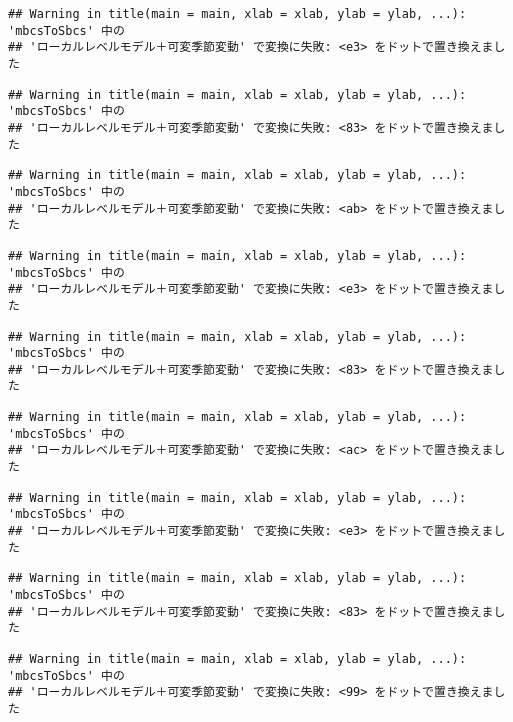 \documentclass[]{article}
\begin{document}
\begin{verbatim}
## Warning in title(main = main, xlab = xlab, ylab = ylab, ...): 'mbcsToSbcs' 中の
## 'ローカルレベルモデル＋可変季節変動' で変換に失敗: <e3> をドットで置き換えました
\end{verbatim}

\begin{verbatim}
## Warning in title(main = main, xlab = xlab, ylab = ylab, ...): 'mbcsToSbcs' 中の
## 'ローカルレベルモデル＋可変季節変動' で変換に失敗: <83> をドットで置き換えました
\end{verbatim}

\begin{verbatim}
## Warning in title(main = main, xlab = xlab, ylab = ylab, ...): 'mbcsToSbcs' 中の
## 'ローカルレベルモデル＋可変季節変動' で変換に失敗: <ab> をドットで置き換えました
\end{verbatim}

\begin{verbatim}
## Warning in title(main = main, xlab = xlab, ylab = ylab, ...): 'mbcsToSbcs' 中の
## 'ローカルレベルモデル＋可変季節変動' で変換に失敗: <e3> をドットで置き換えました
\end{verbatim}

\begin{verbatim}
## Warning in title(main = main, xlab = xlab, ylab = ylab, ...): 'mbcsToSbcs' 中の
## 'ローカルレベルモデル＋可変季節変動' で変換に失敗: <83> をドットで置き換えました
\end{verbatim}

\begin{verbatim}
## Warning in title(main = main, xlab = xlab, ylab = ylab, ...): 'mbcsToSbcs' 中の
## 'ローカルレベルモデル＋可変季節変動' で変換に失敗: <ac> をドットで置き換えました
\end{verbatim}

\begin{verbatim}
## Warning in title(main = main, xlab = xlab, ylab = ylab, ...): 'mbcsToSbcs' 中の
## 'ローカルレベルモデル＋可変季節変動' で変換に失敗: <e3> をドットで置き換えました
\end{verbatim}

\begin{verbatim}
## Warning in title(main = main, xlab = xlab, ylab = ylab, ...): 'mbcsToSbcs' 中の
## 'ローカルレベルモデル＋可変季節変動' で変換に失敗: <83> をドットで置き換えました
\end{verbatim}

\begin{verbatim}
## Warning in title(main = main, xlab = xlab, ylab = ylab, ...): 'mbcsToSbcs' 中の
## 'ローカルレベルモデル＋可変季節変動' で変換に失敗: <99> をドットで置き換えました
\end{verbatim}
\end{document}
